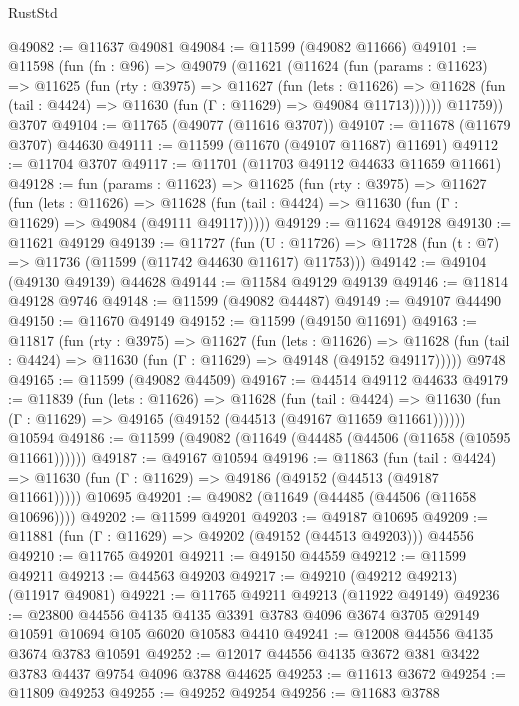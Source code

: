 \begin{lexlean}{RustStd}
\begin{coremodule}
@49082 := @11637 @49081
@49084 := @11599 (@49082 @11666)
@49101 := @11598
    (fun (fn : @96) =>
    @49079
      (@11621
        (@11624
          (fun (params : @11623) =>
          @11625
            (fun (rty : @3975) =>
            @11627
              (fun (lets : @11626) =>
              @11628 (fun (tail : @4424) => @11630 (fun (Γ : @11629) => @49084 @11713))))))
        @11759))
    @3707
@49104 := @11765 (@49077 (@11616 @3707))
@49107 := @11678 (@11679 @3707) @44630
@49111 := @11599 (@11670 (@49107 @11687) @11691)
@49112 := @11704 @3707
@49117 := @11701 (@11703 @49112 @44633 @11659 @11661)
@49128 := fun (params : @11623) =>
  @11625
    (fun (rty : @3975) =>
    @11627
      (fun (lets : @11626) =>
      @11628 (fun (tail : @4424) => @11630 (fun (Γ : @11629) => @49084 (@49111 @49117)))))
@49129 := @11624 @49128
@49130 := @11621 @49129
@49139 := @11727
    (fun (U : @11726) => @11728 (fun (t : @7) => @11736 (@11599 (@11742 @44630 @11617) @11753)))
@49142 := @49104 (@49130 @49139) @44628
@49144 := @11584 @49129 @49139
@49146 := @11814 @49128 @9746
@49148 := @11599 (@49082 @44487)
@49149 := @49107 @44490
@49150 := @11670 @49149
@49152 := @11599 (@49150 @11691)
@49163 := @11817
    (fun (rty : @3975) =>
    @11627
      (fun (lets : @11626) =>
      @11628 (fun (tail : @4424) => @11630 (fun (Γ : @11629) => @49148 (@49152 @49117)))))
    @9748
@49165 := @11599 (@49082 @44509)
@49167 := @44514 @49112 @44633
@49179 := @11839
    (fun (lets : @11626) =>
    @11628
      (fun (tail : @4424) =>
      @11630 (fun (Γ : @11629) => @49165 (@49152 (@44513 (@49167 @11659 @11661))))))
    @10594
@49186 := @11599 (@49082 (@11649 (@44485 (@44506 (@11658 (@10595 @11661))))))
@49187 := @49167 @10594
@49196 := @11863
    (fun (tail : @4424) => @11630 (fun (Γ : @11629) => @49186 (@49152 (@44513 (@49187 @11661)))))
    @10695
@49201 := @49082 (@11649 (@44485 (@44506 (@11658 @10696))))
@49202 := @11599 @49201
@49203 := @49187 @10695
@49209 := @11881 (fun (Γ : @11629) => @49202 (@49152 (@44513 @49203))) @44556
@49210 := @11765 @49201
@49211 := @49150 @44559
@49212 := @11599 @49211
@49213 := @44563 @49203
@49217 := @49210 (@49212 @49213) (@11917 @49081)
@49221 := @11765 @49211 @49213 (@11922 @49149)
@49236 := @23800
    @44556
    @4135
    @4135
    @3391
    @3783
    @4096
    @3674
    @3705
    @29149
    @10591
    @10694
    @105
    @6020
    @10583
    @4410
@49241 := @12008 @44556 @4135 @3674 @3783 @10591
@49252 := @12017 @44556 @4135 @3672 @381 @3422 @3783 @4437 @9754 @4096 @3788 @44625
@49253 := @11613 @3672
@49254 := @11809 @49253
@49255 := @49252 @49254
@49256 := @11683 @3788

\end{coremodule}
\end{lexlean}
